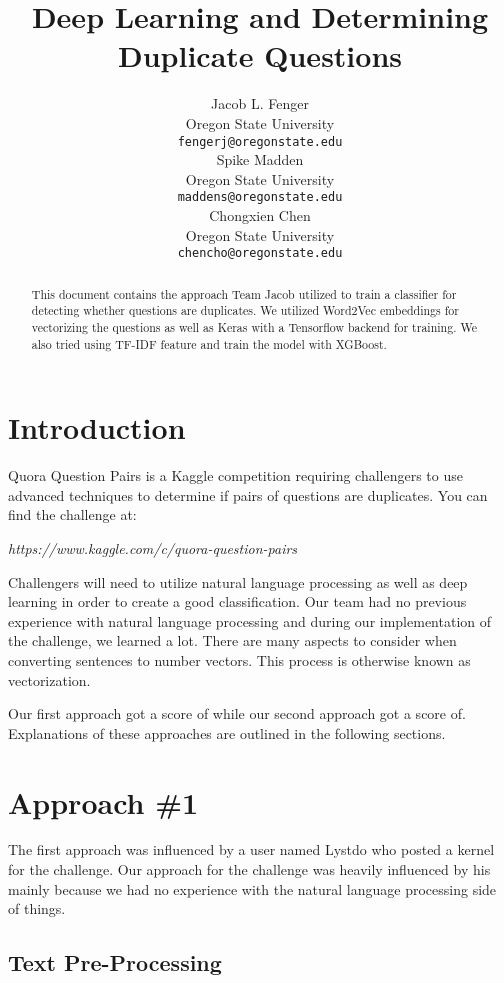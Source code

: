 \documentclass{article}
\title{Deep Learning and Determining Duplicate Questions}
\author{
  Jacob L. Fenger\\
  Oregon State University\\
  \texttt{fengerj@oregonstate.edu} \\
  \And
  Spike Madden \\
  Oregon State University\\
  \texttt{maddens@oregonstate.edu} \\
  \AND
  Chongxien Chen \\
  Oregon State University\\
  \texttt{chencho@oregonstate.edu} \\
}
\begin{document}

\maketitle

\begin{abstract}
  This document contains the approach Team Jacob utilized to train a classifier
  for detecting whether questions are duplicates. We utilized Word2Vec embeddings
  for vectorizing the questions as well as Keras with a Tensorflow backend
  for training. We also tried using TF-IDF feature and train the model with XGBoost.
\end{abstract}

\section{Introduction}

Quora Question Pairs is a Kaggle competition requiring challengers to use
advanced techniques to determine if pairs of questions are duplicates. You
can find the challenge at:
\begin{center}
\textit{https://www.kaggle.com/c/quora-question-pairs}
\end{center}

Challengers will need to utilize natural language processing as well as
deep learning in order to create a good classification. Our team had no
previous experience with natural language processing and during our
implementation of the challenge, we learned a lot. There are many aspects
to consider when converting sentences to number vectors. This process is
otherwise known as vectorization.

Our first approach got a score of  while our second approach got a score
of. Explanations of these approaches are outlined in the following
sections.

\section{Approach \#1}

The first approach was influenced by a user named Lystdo who posted a kernel
for the challenge. Our approach for the challenge was heavily influenced by
his mainly because we had no experience with the natural language processing
side of things.

\subsection{Text Pre-Processing}
\end{document}
